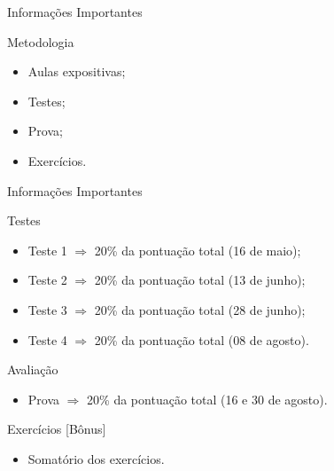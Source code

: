 \documentclass[xcolor=dvipsnames,table]{beamer}
\begin{document}
	\begin{frame}{Informações Importantes}
		\begin{block}{Metodologia}
			\begin{itemize}
				\item Aulas expositivas;
				\item Testes;
				\item Prova;
				\item Exercícios.
			\end{itemize}
		\end{block}
	\end{frame}
	
	\begin{frame}{Informações Importantes}
		\begin{block}{Testes}
			\begin{itemize}
				\item Teste 1 $\Rightarrow$ 20\% da pontuação total (16 de maio);
				\item Teste 2 $\Rightarrow$ 20\% da pontuação total (13 de junho);
				\item Teste 3 $\Rightarrow$ 20\% da pontuação total (28 de junho);
				\item Teste 4 $\Rightarrow$  20\% da pontuação total (08 de agosto).
			\end{itemize}
		\end{block}
		\begin{block}{Avaliação}
			\begin{itemize}
				\item Prova $\Rightarrow$  20\% da pontuação total (16 e 30 de agosto).
			\end{itemize}
		\end{block}
		\begin{block}{Exercícios [Bônus]}
			\begin{itemize}
				\item Somatório dos exercícios.
			\end{itemize}
		\end{block}
	\end{frame}
    
\end{document}
